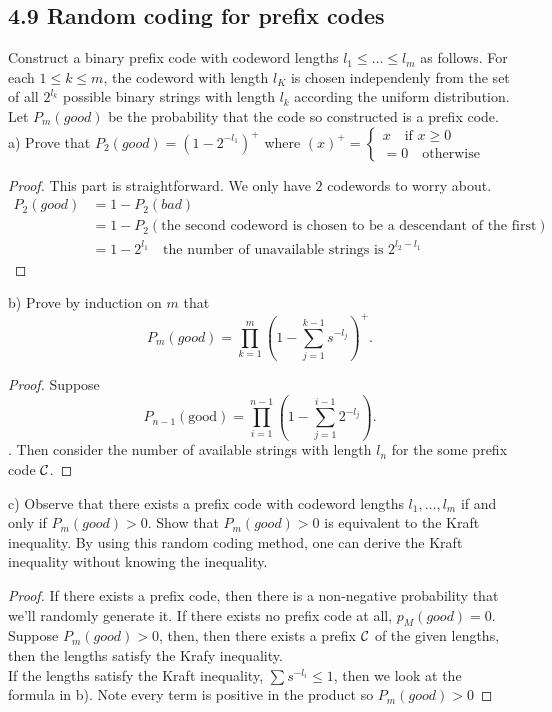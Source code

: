 \documentclass[../main.tex]{subfiles}
\begin{document}
 \subsection*{4.9 Random coding for prefix codes}
 Construct a binary prefix code with codeword lengths $l_1\leq \dots \leq l_m$ as follows. For each $1\leq k\leq m$, the codeword with length $l_K$ is chosen independenly from the set of all $2^{l_k}$ possible binary strings with length $l_k$ according the uniform distribution. Let $P_m(good)$ be the probability that the code so constructed is a prefix code.\\
 a) Prove that $P_2(good)=(1-2^{-l_1})^+$ where $(x)^+=\begin{cases}
     x \quad\text{if $x\geq 0$}\\
     =0 \quad \text{otherwise}
      \end{cases}$
\begin{proof}
  This part is straightforward. We only have $2$ codewords to worry about. \begin{align*}
      P_2(good) &= 1 - P_2(bad)\\
      &= 1 - P_2(\text{the second codeword is chosen to be a descendant of the first})\\
      &= 1 - 2^{l_1} \quad \text{the number of unavailable strings is $2^{l_2-l_1}$}
  \end{align*}
\end{proof}
 b) Prove by induction on $m$ that \begin{equation*}
     P_m(good) = \prod_{k=1}^m(1-\sum_{j=1}^{k-1}s^{-l_j})^+.
 \end{equation*}
 \begin{proof}
     Suppose \[
P_{n-1}(\text{good}) = \prod_{i=1}^{n-1} \left( 1 - \sum_{j=1}^{i-1} 2^{-l_j} \right).
\]. Then consider the number of available strings with length $l_n$ for the some prefix code $\mathcal{C}$.
 \end{proof}
 c) Observe that there exists a prefix code with codeword lengths $l_1,\dots,l_m$ if and only if $P_m(good) > 0$. Show that $P_m(good)>0$ is equivalent to the Kraft inequality.
 By using this random coding method, one can derive the Kraft inequality without knowing the inequality.
 \begin{proof}
     If there exists a prefix code, then there is a non-negative probability that we'll randomly generate it. If there exists no prefix code at all, $p_M(good)=0$.\\
     Suppose $P_m(good)>0$, then, then there exists a prefix $\mathcal{C}$ of the given lengths, then the lengths satisfy the Krafy inequality.\\
     If the lengths satisfy the Kraft inequality, $\sum s^{-l_i} \leq 1$, then we look at the formula in b). Note every term is positive in the product so $P_m(good)>0$
 \end{proof}
 
\end{document}
